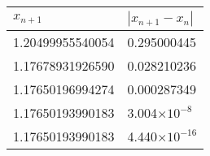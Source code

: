 \documentclass[table,x11names]{book}
\begin{document}
\begin{tabular}{ll}
\rowcolor{LightBlue2} $x_{n+1}$ & $|x_{n+1}-x_n|$\\ \hline
\cellcolor[gray]{0.80} 1.20499955540054 & 0.295000445\\
1.17678931926590 & 0.028210236\\
1.17650196994274 & 0.000287349\\
1.17650193990183 & 3.004$\times10^{-8}$\\
\cellcolor[gray]{0.80} 1.17650193990183 & 4.440$\times10^{-16}$\\ \hline
\end{tabular}
\end{document}

